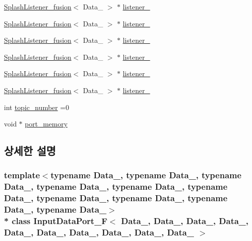 \begin{DoxyCompactItemize}
\item 
\hyperlink{classSplashListener__fusion}{Splash\+Listener\+\_\+fusion}$<$ Data\+\_ $>$ $\ast$ \hyperlink{classInputDataPort__F_af34ec96b45b9f778eebac6e72901901a}{listener\+\_}
\item 
\hyperlink{classSplashListener__fusion}{Splash\+Listener\+\_\+fusion}$<$ Data\+\_ $>$ $\ast$ \hyperlink{classInputDataPort__F_a2306c92d87224281fbe8af0c1f4a7b1a}{listener\+\_}
\item 
\hyperlink{classSplashListener__fusion}{Splash\+Listener\+\_\+fusion}$<$ Data\+\_ $>$ $\ast$ \hyperlink{classInputDataPort__F_aba79969b7956c70a2f2101fc55370447}{listener\+\_}
\item 
\hyperlink{classSplashListener__fusion}{Splash\+Listener\+\_\+fusion}$<$ Data\+\_ $>$ $\ast$ \hyperlink{classInputDataPort__F_a99b57cc9e7aadd5bef83a3dc96eb7680}{listener\+\_}
\item 
\hyperlink{classSplashListener__fusion}{Splash\+Listener\+\_\+fusion}$<$ Data\+\_ $>$ $\ast$ \hyperlink{classInputDataPort__F_af2b7e4cfb20ef4fb3e945e32d8792fd2}{listener\+\_}
\item 
\hyperlink{classSplashListener__fusion}{Splash\+Listener\+\_\+fusion}$<$ Data\+\_ $>$ $\ast$ \hyperlink{classInputDataPort__F_a8af8e7aa880396f0945052e5cfc1985b}{listener\+\_}
\item 
int \hyperlink{classInputDataPort__F_aa3975f3abd074e8fb18f34a4806d1f85}{topic\+\_\+number} =0
\item 
void $\ast$ \hyperlink{classInputDataPort__F_ab79e16d625d49923eb7e3864f8b2359e}{port\+\_\+memory}
\end{DoxyCompactItemize}


\subsection{상세한 설명}
\subsubsection*{template$<$typename Data\+\_, typename Data\+\_, typename Data\+\_, typename Data\+\_, typename Data\+\_, typename Data\+\_, typename Data\+\_, typename Data\+\_, typename Data\+\_, typename Data\+\_$>$\\*
class Input\+Data\+Port\+\_\+\+F$<$ Data\+\_, Data\+\_, Data\+\_, Data\+\_, Data\+\_, Data\+\_, Data\+\_, Data\+\_, Data\+\_, Data\+\_ $>$}



